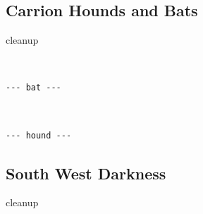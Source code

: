 







\goodbreak
{}
\subsection*{Carrion Hounds and Bats}
\label{sec:carrionstats}

\todo cleanup

\

\begin{samepage}
\small \begin{verbatim}
--- bat ---
\end{verbatim} \normalsize
\end{samepage}

\

\goodbreak
\begin{samepage}
\small \begin{verbatim}
--- hound ---
\end{verbatim} \normalsize
\end{samepage}











\goodbreak
{}
\subsection*{South West Darkness}
\label{sec:swdarkstats}

\todo cleanup

\

